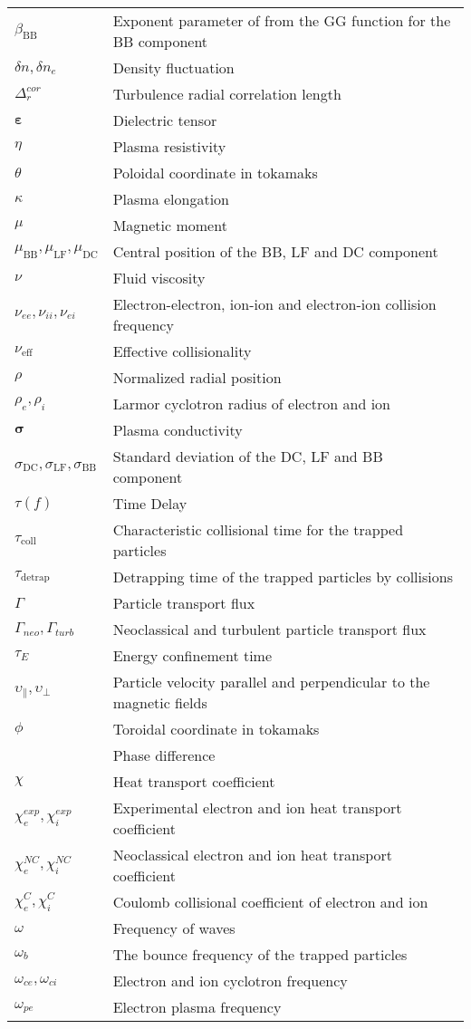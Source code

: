 \begin{longtable}{ll}
$\beta_\mathrm{BB}$ & Exponent parameter of from the GG function for the BB component \\
$\delta n, \delta n_e$ & Density fluctuation \\
$\Delta_r^{cor}$ & Turbulence radial correlation length \\
$\boldsymbol{\varepsilon}$ & Dielectric tensor \\
$\eta$ & Plasma resistivity \\
$\theta$ & Poloidal coordinate in tokamaks \\
$\kappa$ & Plasma elongation \\
$\mu$ & Magnetic moment \\
$\mu_\mathrm{BB}, \mu_\mathrm{LF}, \mu_\mathrm{DC}$ & Central position of the BB, LF and DC component  \\
$\nu$ & Fluid viscosity \\
$\nu_{ee}, \nu_{ii}, \nu_{ei}$ & Electron-electron, ion-ion and electron-ion collision frequency \\
$\nu_\mathrm{eff}$ & Effective collisionality \\
$\rho$ & Normalized radial position \\
$\rho_e, \rho_i$ & Larmor cyclotron radius of electron and ion \\
$\boldsymbol{\sigma}$ & Plasma conductivity \\
$\sigma_\mathrm{DC}, \sigma_\mathrm{LF}, \sigma_\mathrm{BB}$ & Standard deviation of the DC, LF and BB component \\
$\tau(f)$ & Time Delay \\
$\tau_\mathrm{coll}$ & Characteristic collisional time for the trapped particles \\
$\tau_\mathrm{detrap}$ & Detrapping time of the trapped particles by collisions \\
$\Gamma$ & Particle transport flux \\
$\Gamma_{neo}, \Gamma_{turb}$ & Neoclassical and turbulent particle transport flux \\
$\tau_E$ & Energy confinement time \\
$\upsilon_{\parallel}, \upsilon_{\perp}$ & Particle velocity parallel and perpendicular to the magnetic fields \\
$\phi$ & Toroidal coordinate in tokamaks \\
$      $ & Phase difference \\
$\chi$ & Heat transport coefficient \\
$\chi_e^{exp}, \chi_i^{exp}$ & Experimental electron and ion heat transport coefficient \\
$\chi_e^{NC}, \chi_i^{NC}$ & Neoclassical electron and ion heat transport coefficient \\
$\chi_e^{C}, \chi_i^{C}$ & Coulomb collisional coefficient of electron and ion \\
$\omega$ & Frequency of waves \\
$\omega_b$ & The bounce frequency of the trapped particles \\
$\omega_{ce}, \omega_{ci}$ & Electron and ion cyclotron frequency \\
$\omega_{pe}$ & Electron plasma frequency \\

\end{longtable}
